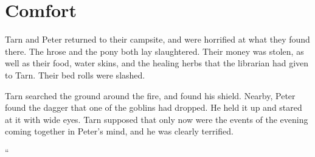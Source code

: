 \chapter{Comfort}

Tarn and Peter returned to their campsite, and were horrified at what they found there.  The hrose and the pony both lay slaughtered.  Their money was stolen, as well as their food, water skins, and the healing herbs that the librarian had given to Tarn.  Their bed rolls were slashed.

Tarn searched the ground around the fire, and found his shield.  Nearby, Peter found the dagger that one of the goblins had dropped.  He held it up and stared at it with wide eyes.  Tarn supposed that only now were the events of the evening coming together in Peter's mind, and he was clearly terrified.

``